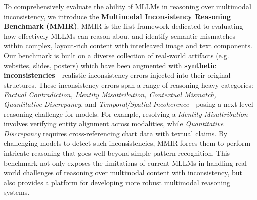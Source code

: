 To comprehensively evaluate the ability of MLLMs in reasoning over multimodal inconsistency, we introduce the \textbf{Multimodal Inconsistency Reasoning Benchmark (MMIR)}. MMIR is the first framework dedicated to evaluating how effectively MLLMs can reason about and identify semantic mismatches within complex, layout-rich content with interleaved image and text components. Our benchmark is built on a diverse collection of real-world artifacts (e.g. websites, slides, posters) which have been augmented with \textbf{synthetic inconsistencies}—realistic inconsistency errors injected into their original structures. These inconsistency errors span a range of reasoning-heavy categories: \textit{Factual Contradiction, Identity Misattribution, Contextual Mismatch, Quantitative Discrepancy}, and \textit{Temporal/Spatial Incoherence}—posing a next-level reasoning challenge for models. For example, resolving a \textit{Identity Misattribution} involves verifying entity alignment across modalities, while \textit{Quantitative Discrepancy} requires cross-referencing chart data with textual claims. By challenging models to detect such inconsistencies, MMIR forces them to perform intricate reasoning that goes well beyond simple pattern recognition. This benchmark not only exposes the limitations of current MLLMs in handling real-world challenges of reasoning over multimodal content with inconsistency, but also provides a platform for developing more robust multimodal reasoning systems.



